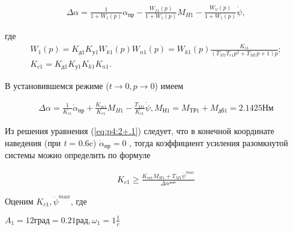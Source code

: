 \begin{equation}%
\label{eq:p4:415}
\begin{alignedat}{2}
\Delta  \alpha =\frac{1}{1+W_{1} \left( p \right) } \alpha _{\textit{пр}}-\frac{W_{f1} \left( p \right) }{1+W_{1} \left( p \right) }M_{H1}-\frac{W_{ \psi } \left( p \right) }{1+W_{1} \left( p \right) } \dot \psi,
\end{alignedat}
\end{equation}

где 
\begin{equation}
\label{eq:p4:415+}
\begin{alignedat}{2}
 W_{1} \left( p \right) =
 K_{\textit{д1}}K_{\textit{у1}}W_{k1} \left( p \right) W_{n1} \left( p \right) =
 W_{k1} \left( p \right) \frac{K_{c1}}{ \left( T_{M1}T_{e1}p^{2}+T_{M1}p+1 \right) p}; \\
  K_{c1}=K_{\textit{д1}}K_{\textit{у1}}K_{k1}K_{n1}.
\end{alignedat}
\end{equation}

В установившемся режиме ($t\rightarrow0, p\rightarrow0$) имеем\par

\begin{equation}
\label{eq:p4:415+2}
\begin{alignedat}{2}
\Delta  \alpha =
\frac{1}{K_{c1}} \dot \alpha_{\textit{пр}} + \frac{K_{m1}}{K_{c1}}M_{H1} - \frac{T_{M1}}{K_{c1}} \dot \psi ,
M_{Н1}=M_{\textit{ТР1}}+M_{\textit{дб1}}=2.1425\textit{Нм}
\end{alignedat}
\end{equation}


Из решения уравнения (\ref{eq:p4:2+.1}) следует, что в конечной координате наведения (при \textit{t} = 0.6c)  \( \dot \alpha _{\textit{пр}}=0 \) , тогда коэффициент усиления разомкнутой системы можно определить по формуле \par

\begin{equation}
\label{eq:p4:416}
\begin{alignedat}{2}
K_{c1} \geq \frac{K_{m1}M_{H1}+T_{M1} \ddot \psi ^{max}}{ \Delta  \alpha ^{\textit{доп}}}
\end{alignedat}
\end{equation}

Оценим  \( K_{c1}, \ddot \psi ^{max} \), где 

$A_1 = 12 \textit{град} = 0.21 \textit{рад}, \omega_1 = 1 \frac{1}{c}$

